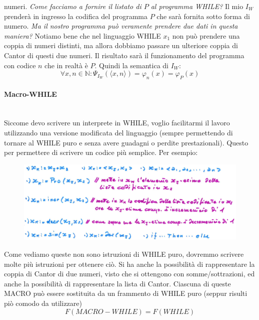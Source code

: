 \documentclass{article}
\begin{document}
numeri. \textit{Come facciamo a fornire il listato di $P$ al programma WHILE?} Il mio $I_W$
prenderà in ingresso la codifica del programma $P$ che sarà fornita sotto forma di numero.
\newline\newline
\textit{Ma il nostro programma può veramente prendere due dati in questa maniera?} Notiamo bene
che nel linguaggio WHILE $x_1$ non può prendere una coppia di numeri distinti, ma allora
dobbiamo passare un ulteriore coppia di Cantor di questi due numeri.
Il risultato sarà il funzionamento del programma con codice $n$ che in realtà è $P$.
Quindi la semantica di $I_W$:
$$\forall x,n\in\mathbb{N}:\Psi_{I_W}(\langle x,n\rangle)=\varphi_n(x)=\varphi_P(x)$$

\paragraph{Macro-WHILE}\mbox{}\\
Siccome devo scrivere un interprete in WHILE, voglio facilitarmi il lavoro utilizzando una
versione modificata del linguaggio (sempre permettendo di tornare al WHILE puro e senza
avere guadagni o perdite prestazionali). Questo per permettere di scrivere un codice
più semplice.
Per esempio:
\begin{figure}[H]
    \centering
    \includegraphics[scale=0.5]{images/macro-while.png}
\end{figure}
Come vediamo queste non sono istruzioni di WHILE puro, dovremmo scrivere molte più istruzioni
per ottenere ciò. Si ha anche la possibilità di rappresentare la coppia di Cantor di due numeri,
visto che si ottengono con somme/sottrazioni, ed anche la possibilità di rappresentare la
lista di Cantor.
\newline\newline
Ciascuna di queste MACRO può essere sostituita da un frammento di WHILE puro (seppur risulti piò comodo
da utilizzare)
$$F(MACRO-WHILE)=F(WHILE)$$
\end{document}
